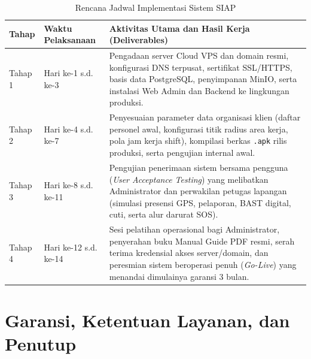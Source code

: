 \documentclass[11pt,a4paper]{article}
\begin{document}
\begin{table}[h!]
\centering
\renewcommand{\arraystretch}{1.2}
\begin{tabularx}{\textwidth}{@{}C{1.8cm}L{4.4cm}X@{}}
\toprule
\textbf{Tahap} & \textbf{Waktu Pelaksanaan} & \textbf{Aktivitas Utama dan Hasil Kerja (Deliverables)} \\
\midrule
Tahap 1 & Hari ke-1 s.d. ke-3 & Pengadaan server Cloud VPS dan domain resmi, konfigurasi DNS terpusat, sertifikat SSL/HTTPS, basis data PostgreSQL, penyimpanan MinIO, serta instalasi Web Admin dan Backend ke lingkungan produksi. \\
Tahap 2 & Hari ke-4 s.d. ke-7 & Penyesuaian parameter data organisasi klien (daftar personel awal, konfigurasi titik radius area kerja, pola jam kerja shift), kompilasi berkas \texttt{.apk} rilis produksi, serta pengujian internal awal. \\
Tahap 3 & Hari ke-8 s.d. ke-11 & Pengujian penerimaan sistem bersama pengguna (\textit{User Acceptance Testing}) yang melibatkan Administrator dan perwakilan petugas lapangan (simulasi presensi GPS, pelaporan, BAST digital, cuti, serta alur darurat SOS). \\
Tahap 4 & Hari ke-12 s.d. ke-14 & Sesi pelatihan operasional bagi Administrator, penyerahan buku Manual Guide PDF resmi, serah terima kredensial akses server/domain, dan peresmian sistem beroperasi penuh (\textit{Go-Live}) yang menandai dimulainya garansi 3 bulan. \\
\bottomrule
\end{tabularx}
\caption{Rencana Jadwal Implementasi Sistem SIAP}
\end{table}

\newpage
\section{Garansi, Ketentuan Layanan, dan Penutup}
\end{document}
